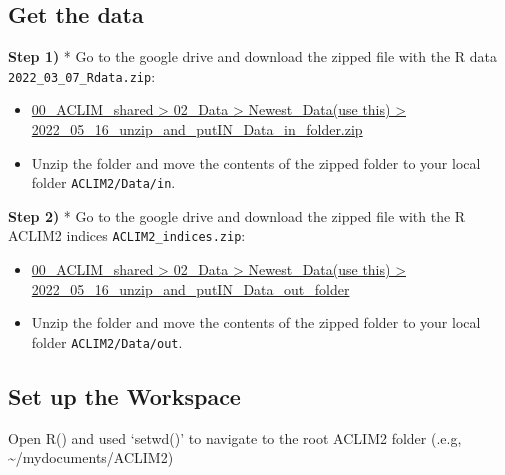 \documentclass[
]{article}
\begin{document}
\hypertarget{get-the-data}{%
\subsection{Get the data}\label{get-the-data}}

\textbf{Step 1)} * Go to the google drive and download the zipped file
with the R data \texttt{2022\_03\_07\_Rdata.zip}:

\begin{itemize}
\item
  \href{https://drive.google.com/drive/folders/11BQEfNEl9vvrN-V0LgS67XS4aLE9pNzz}{00\_ACLIM\_shared
  \textgreater{} 02\_Data \textgreater{} Newest\_Data(use this)
  \textgreater{} 2022\_05\_16\_unzip\_and\_putIN\_Data\_in\_folder.zip}
\item
  Unzip the folder and move the contents of the zipped folder to your
  local folder \texttt{ACLIM2/Data/in}.
\end{itemize}

\textbf{Step 2)} * Go to the google drive and download the zipped file
with the R ACLIM2 indices \texttt{ACLIM2\_indices.zip}:

\begin{itemize}
\item
  \href{https://drive.google.com/drive/folders/11BQEfNEl9vvrN-V0LgS67XS4aLE9pNzz}{00\_ACLIM\_shared
  \textgreater{} 02\_Data \textgreater{} Newest\_Data(use this)
  \textgreater{} 2022\_05\_16\_unzip\_and\_putIN\_Data\_out\_folder}
\item
  Unzip the folder and move the contents of the zipped folder to your
  local folder \texttt{ACLIM2/Data/out}.
\end{itemize}

\hypertarget{set-up-the-workspace}{%
\subsection{Set up the Workspace}\label{set-up-the-workspace}}

Open R() and used `setwd()' to navigate to the root ACLIM2 folder (.e.g,
\textasciitilde/mydocuments/ACLIM2)
\end{document}
